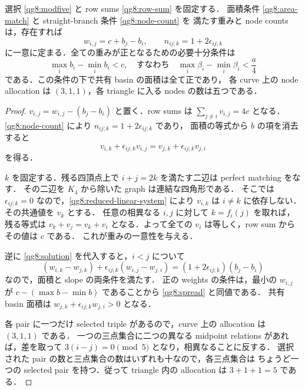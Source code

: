 \begin{theorem}\label{qg8:unique-weights}
選択 \eqref{qg8:modfive} と row sums \eqref{qg8:row-sum} を固定する．
面積条件 \eqref{qg8:area-match} と straight-branch 条件 \eqref{qg8:node-count} を
満たす重みと node counts は，存在すれば
\begin{equation}\label{qg8:solution}
 w_{i,j}=c+b_j-b_i,\qquad n_{ij;k}=1+2\epsilon_{ij;k}
\end{equation}
に一意に定まる．全ての重みが正となるための必要十分条件は
\begin{equation}\label{qg8:spread}
 \max_i b_i-\min_i b_i<c,
 \quad\text{すなわち}\quad \max_i\beta_i-\min_i\beta_i<\frac a4
\end{equation}
である．この条件の下で共有 basin の面積は全て正であり，
各 curve 上の node allocation は $(3,1,1)$，各 triangle に入る nodes の数は五つである．
\end{theorem}

\begin{proof}
$v_{i,j}=w_{i,j}-(b_j-b_i)$ と置く．row sums は $\sum_{j\ne i}v_{i,j}=4c$ となる．
\eqref{qg8:node-count} により $n_{ij;k}=1+2\epsilon_{ij;k}$ であり，
面積の等式から $b$ の項を消去すると
\begin{equation}\label{qg8:reduced-linear-system}
 v_{i,k}+\epsilon_{ij;k}v_{i,j}
 =v_{j,k}+\epsilon_{ij;k}v_{j,i}
\end{equation}
を得る．

$k$ を固定する．残る四頂点上で $i+j=2k$ を満たす二辺は perfect matching をなす．
その二辺を $K_4$ から除いた graph は連結な四角形である．
そこでは $\epsilon_{ij;k}=0$ なので，\eqref{qg8:reduced-linear-system} により
$v_{i,k}$ は $i\ne k$ に依存しない．その共通値を $v_k$ とする．
任意の相異なる $i,j$ に対して $k=f_i(j)$ を取れば，残る等式は
$v_k+v_j=v_k+v_i$ となる．よって全ての $v_i$ は等しく，row sum からその値は $c$ である．
これが重みの一意性を与える．

逆に \eqref{qg8:solution} を代入すると，$i<j$ について
\[
 (w_{i,k}-w_{j,k})+
  \epsilon_{ij;k}(w_{i,j}-w_{j,i})
 =(1+2\epsilon_{ij;k})(b_j-b_i)
\]
なので，面積と slope の両条件を満たす．
正の weights の条件は，最小の $w_{i,j}$ が
$c-(\max b-\min b)$ であることから \eqref{qg8:spread} と同値である．
共有 basin 面積は $w_{j,k}+\epsilon_{ij;k}w_{j,i}>0$ となる．

各 pair に一つだけ selected triple があるので，curve 上の allocation は $(3,1,1)$ である．
一つの三点集合に二つの異なる midpoint relations があれば，差を取って
$3(i-j)=0\pmod5$ となり，相異なることに反する．
選択された pair の数と三点集合の数はいずれも十なので，各三点集合は
ちょうど一つの selected pair を持つ．従って triangle 内の allocation は $3+1+1=5$ である．
\end{proof}

